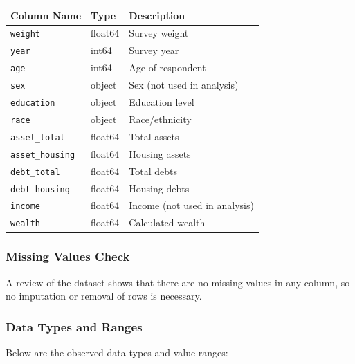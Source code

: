 \documentclass[
  12pt]{article}
\begin{document}
\begin{longtable}[]{@{}lll@{}}
\toprule\noalign{}
Column Name & Type & Description \\
\midrule\noalign{}
\endhead
\bottomrule\noalign{}
\endlastfoot
\texttt{weight} & float64 & Survey weight \\
\texttt{year} & int64 & Survey year \\
\texttt{age} & int64 & Age of respondent \\
\texttt{sex} & object & Sex (not used in analysis) \\
\texttt{education} & object & Education level \\
\texttt{race} & object & Race/ethnicity \\
\texttt{asset\_total} & float64 & Total assets \\
\texttt{asset\_housing} & float64 & Housing assets \\
\texttt{debt\_total} & float64 & Total debts \\
\texttt{debt\_housing} & float64 & Housing debts \\
\texttt{income} & float64 & Income (not used in analysis) \\
\texttt{wealth} & float64 & Calculated wealth \\
\end{longtable}

\subsubsection{Missing Values Check}\label{missing-values-check}

A review of the dataset shows that there are no missing values in any
column, so no imputation or removal of rows is necessary.

\subsubsection{Data Types and Ranges}\label{data-types-and-ranges}

Below are the observed data types and value ranges:
\end{document}

